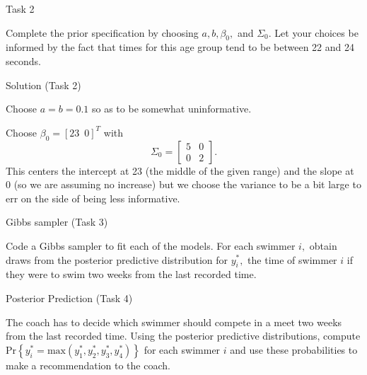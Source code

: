 \documentclass[
  ignorenonframetext,
]{beamer}
\begin{document}
\begin{frame}{Task 2}
\protect\hypertarget{task-2}{}

Complete the prior specification by choosing \(a,b,\beta_0,\) and
\(\Sigma_0.\) Let your choices be informed by the fact that times for
this age group tend to be between 22 and 24 seconds.

\end{frame}

\begin{frame}{Solution (Task 2)}
\protect\hypertarget{solution-task-2}{}

Choose \(a=b=0.1\) so as to be somewhat uninformative.

Choose \(\beta_0 = [23\,\,\, 0]^{T}\) with \[\Sigma_0 =
\begin{bmatrix}
    5 & 0  \\
    0 & 2 
\end{bmatrix}.
\] This centers the intercept at 23 (the middle of the given range) and
the slope at 0 (so we are assuming no increase) but we choose the
variance to be a bit large to err on the side of being less informative.

\end{frame}

\begin{frame}{Gibbs sampler (Task 3)}
\protect\hypertarget{gibbs-sampler-task-3}{}

Code a Gibbs sampler to fit each of the models. For each swimmer \(i,\)
obtain draws from the posterior predictive distribution for \(y_i^{*},\)
the time of swimmer \(i\) if they were to swim two weeks from the last
recorded time.

\end{frame}

\begin{frame}{Posterior Prediction (Task 4)}
\protect\hypertarget{posterior-prediction-task-4}{}

The coach has to decide which swimmer should compete in a meet two weeks
from the last recorded time. Using the posterior predictive
distributions, compute
\(\text{Pr}\left\{y_i^{*}=\text{max}\left(y_1^{*},y_2^{*},y_3^{*},y_4^{*}\right)\right\}\)
for each swimmer \(i\) and use these probabilities to make a
recommendation to the coach.

\end{frame}
\end{document}
